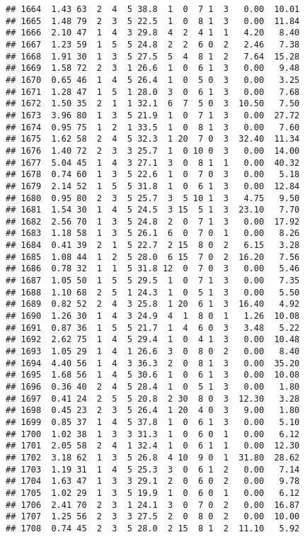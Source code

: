 \documentclass[
]{article}
\begin{document}
\begin{verbatim}
## 1664  1.43 63  2  4  5 38.8  1  0  7 1  3   0.00  10.01
## 1665  1.48 79  2  3  5 22.5  1  0  8 1  3   0.00  11.84
## 1666  2.10 47  1  4  3 29.8  4  2  4 1  1   4.20   8.40
## 1667  1.23 59  1  5  5 24.8  2  2  6 0  2   2.46   7.38
## 1668  1.91 30  1  3  5 27.5  5  4  8 1  2   7.64  15.28
## 1669  1.58 72  2  3  1 26.6  1  0  6 1  3   0.00   9.48
## 1670  0.65 46  1  4  5 26.4  1  0  5 0  3   0.00   3.25
## 1671  1.28 47  1  5  1 28.0  3  0  6 1  3   0.00   7.68
## 1672  1.50 35  2  1  1 32.1  6  7  5 0  3  10.50   7.50
## 1673  3.96 80  1  3  5 21.9  1  0  7 1  3   0.00  27.72
## 1674  0.95 75  1  2  1 33.5  1  0  8 1  3   0.00   7.60
## 1675  1.62 58  2  4  5 32.3  1 20  7 0  3  32.40  11.34
## 1676  1.40 72  2  3  3 25.7  1  0 10 0  3   0.00  14.00
## 1677  5.04 45  1  4  3 27.1  3  0  8 1  1   0.00  40.32
## 1678  0.74 60  1  3  5 22.6  1  0  7 0  3   0.00   5.18
## 1679  2.14 52  1  5  5 31.8  1  0  6 1  3   0.00  12.84
## 1680  0.95 80  2  3  5 25.7  3  5 10 1  3   4.75   9.50
## 1681  1.54 30  1  4  5 24.5  3 15  5 1  3  23.10   7.70
## 1682  2.56 70  1  3  5 24.8  2  0  7 1  3   0.00  17.92
## 1683  1.18 58  1  3  5 26.1  6  0  7 0  1   0.00   8.26
## 1684  0.41 39  2  1  5 22.7  2 15  8 0  2   6.15   3.28
## 1685  1.08 44  1  2  5 28.0  6 15  7 0  2  16.20   7.56
## 1686  0.78 32  1  1  5 31.8 12  0  7 0  3   0.00   5.46
## 1687  1.05 50  1  5  5 29.5  1  0  7 1  3   0.00   7.35
## 1688  1.10 68  2  5  1 24.3  1  0  5 1  3   0.00   5.50
## 1689  0.82 52  2  4  3 25.8  1 20  6 1  3  16.40   4.92
## 1690  1.26 30  1  4  3 24.9  4  1  8 0  1   1.26  10.08
## 1691  0.87 36  1  5  5 21.7  1  4  6 0  3   3.48   5.22
## 1692  2.62 75  1  4  5 29.4  1  0  4 1  3   0.00  10.48
## 1693  1.05 29  1  4  1 26.6  3  0  8 0  2   0.00   8.40
## 1694  4.40 56  1  4  3 36.3  2  0  8 1  3   0.00  35.20
## 1695  1.68 56  1  4  5 30.6  1  0  6 1  3   0.00  10.08
## 1696  0.36 40  2  4  5 28.4  1  0  5 1  3   0.00   1.80
## 1697  0.41 24  2  5  5 20.8  2 30  8 0  3  12.30   3.28
## 1698  0.45 23  2  3  5 26.4  1 20  4 0  3   9.00   1.80
## 1699  0.85 37  1  4  5 37.8  1  0  6 1  3   0.00   5.10
## 1700  1.02 38  1  3  3 31.3  1  0  6 0  1   0.00   6.12
## 1701  2.05 58  2  4  1 32.4  1  0  6 1  1   0.00  12.30
## 1702  3.18 62  1  3  5 26.8  4 10  9 0  1  31.80  28.62
## 1703  1.19 31  1  4  5 25.3  3  0  6 1  2   0.00   7.14
## 1704  1.63 47  1  3  3 29.1  2  0  6 0  2   0.00   9.78
## 1705  1.02 29  1  3  5 19.9  1  0  6 0  1   0.00   6.12
## 1706  2.41 70  2  3  1 24.1  3  0  7 0  2   0.00  16.87
## 1707  1.25 56  2  3  3 27.5  2  0  8 0  2   0.00  10.00
## 1708  0.74 45  2  3  5 28.0  2 15  8 1  2  11.10   5.92

\end{verbatim}
\end{document}
